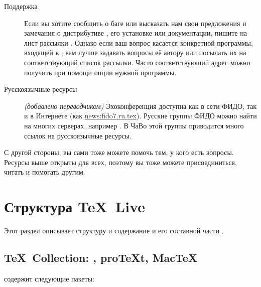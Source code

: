\documentclass{article}
\begin{document}
\begin{description}
\item [Поддержка \TL{}] Если вы хотите сообщить о баге или
  высказать нам свои предложения и замечания о дистрибутиве \TL{},
  его установке или документации, пишите на лист рассылки
  .  Однако если ваш вопрос касается
  конкретной программы, входящей в  \TL{}, вам лучше задавать
  вопросы её автору или посылать их на соответствующий список
  рассылки.  Часто соответствующий адрес можно получить при помощи
  опции  нужной программы.
  
\item[Русскоязычные ресурсы] \emph{(добавлено переводчиком)}
  Эхоконференция  доступна как в сети ФИДО, так и в
  Интернете (как \url{news:fido7.ru.tex}).  Русские группы ФИДО можно
  найти на многих серверах, например . В ЧаВо
  этой группы  приводится много ссылок на
  русскоязычные ресурсы.

\end{description}

С другой стороны, вы сами тоже можете помочь тем, у кого есть вопросы.
Ресурсы выше открыты для всех, поэтому вы тоже можете присоединиться,
читать и помогать другим.

                                


\section{Структура \protect\TeX\protect\ Live}
\label{sec:overview-tl}

Этот раздел описывает структуру и содержание \TK{} и его составной
части \TL{}.


\subsection{\protect\TeX\protect\ Collection: \TL, pro\protect\TeX{}t, Mac\protect\TeX}
\label{sec:tl-coll-dists}

\DVD{} \TK{} содержит следующие пакеты:
\end{document}
